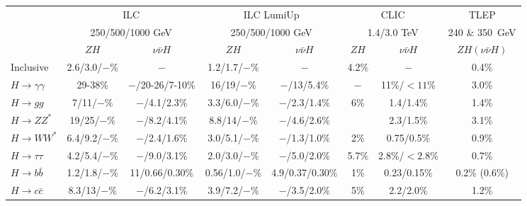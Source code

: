   \medskip
  
\newcommand{\ZH}{$ZH$}
\newcommand{\nnH}{ $\nu \bar{\nu} H$}
\newcommand{\nnHH}{ $\nu \bar{\nu} HH$}

\begin{table}[htb!]
\begin{center}
\tiny
\begin{tabular}{l|cc|cc|cc|c} \hline\hline
                        & \multicolumn{2}{c|}{ILC}                   & \multicolumn{2}{c|}{ILC LumiUp}                   & \multicolumn{2}{c|}{CLIC}              & \multicolumn{1}{c}{TLEP} \\
		        & \multicolumn{2}{c|}{250/500/1000 GeV}      & \multicolumn{2}{c|}{250/500/1000 GeV}             & \multicolumn{2}{c|}{1.4/3.0 TeV}       & \multicolumn{1}{c}{240 \& 350~GeV} \\ \hline
		        & \ZH            & \nnH & \ZH            & \nnH                 &  \ZH       &        \nnH           &  \ZH $(\nu\bar{\nu}H)$     \\ \hline
Inclusive              & 2.6/3.0/$-$\%  &  $-$ & 1.2/1.7/$-$\%  &  $-$                 &  4.2\%       &  $-$                  &  0.4\%              \\
$H\to \gamma\gamma$    & 29-38\%        & $-$/20-26/7-10\% & 16/19/$-$\%     & $-$/13/5.4\%           &  $-$           &  11\%/$<11$\%        &  3.0\%   \\
$H\to gg$              & 7/11/$-$\%     & $-$/4.1/2.3\% & 3.3/6.0/$-$\%      & $-$/2.3/1.4\%            &  6\%    &  1.4/1.4\%            &  1.4\%    \\
$H\to ZZ^*$            & 19/25/$-$\%    & $-$/8.2/4.1\% & 8.8/14/$-$\%       & $-$/4.6/2.6\%            &         &  2.3/1.5\%            &  3.1\% \\
$H\to WW^*$            & 6.4/9.2/$-$\%  & $-$/2.4/1.6\% & 3.0/5.1/$-$\%      & $-$/1.3/1.0\%            &  2\%    &  0.75/0.5\% &  0.9\%        \\
$H\to\tau\tau$         & 4.2/5.4/$-$\%  & $-$/9.0/3.1\%  & 2.0/3.0/$-$\%      & $-$/5.0/2.0\%            &  5.7\%         &  2.8\%/$<2.8$\%            &  0.7\%  \\
$H\to b\bar{b}$        & 1.2/1.8/$-$\%  & 11/0.66/0.30\% & 0.56/1.0/$-$\%    & 4.9/0.37/0.30\%          &  1\%    &  0.23/0.15\%          &  0.2\%  (0.6\%)    \\
$H\to c\bar{c}$        & 8.3/13/$-$\%   & $-$/6.2/3.1\% & 3.9/7.2/$-$\%      & $-$/3.5/2.0\%            &  5\%    &  2.2/2.0\%            &  1.2\%    \\

\end{tabular}
\end{center}
\end{table}
